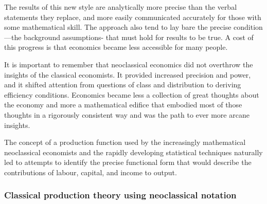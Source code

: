 
The results of this new style are analytically more precise than the verbal statements they replace, and more easily communicated accurately for those with some mathematical skill. The approach also tend to lay bare the precise condition---the background assumptions- that must hold for results to be true. A cost of this progress is that economics became less accessible for many people. 

It is important to remember that neoclassical economics did not overthrow the insights of the classical economists. It provided increased precision and power, and it shifted attention from questions of class and distribution to deriving efficiency conditions. Economics became less a collection of great thoughts about the economy and more a mathematical edifice that embodied most of those thoughts in a rigorously consistent way and was the path to ever more arcane insights.

The concept of a production function used by the increasingly mathematical neoclassical economists and  the rapidly developing statistical techniques  naturally led to attempts to identify the precise \gls{functional form} that would describe the contributions of labour, capital, and income to output.
 
\subsubsection{Classical production theory using neoclassical notation}



